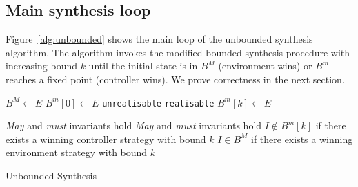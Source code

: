\documentclass{llncs}
\newcommand{\textoverline}[1]{$\overline{\mbox{#1}}$}
\begin{document}


\subsection{Main synthesis loop}

Figure~\ref{alg:unbounded} shows the main loop of the unbounded synthesis algorithm.
The algorithm invokes the modified bounded synthesis procedure with increasing bound $k$
until the initial state is in $B^M$ (environment wins) or $B^m$ reaches a fixed point 
(controller wins). We prove correctness in the next section.

\begin{algorithm}[h]
    \begin{algorithmic}[1]
            \State $B^M \gets E$
            \State $B^m[0] \gets E$
                    \Return \texttt{unrealisable} 
                \EndIIf
                 
                    \State \hspace{\algorithmicindent} \Return \texttt{realisable} 
                \EndIIf
                \State $B^m[k] \gets E$
                \State {}
            \EndFor
        \EndFunction
    \end{algorithmic}

    \begin{algorithmic}
        \Require \emph{May} and \emph{must} invariants hold
        \Ensure \emph{May} and \emph{must} invariants hold
        \Ensure $I \not\in B^m[k]$ if there exists a winning controller strategy with bound $k$
        \Ensure $I \in B^M$ if there exists a winning environment strategy with bound $k$
            \State \Return {}
        \EndFunction
    \end{algorithmic}
    \caption{Unbounded Synthesis}
    \label{alg:unbounded}
\end{algorithm}
\end{document}

